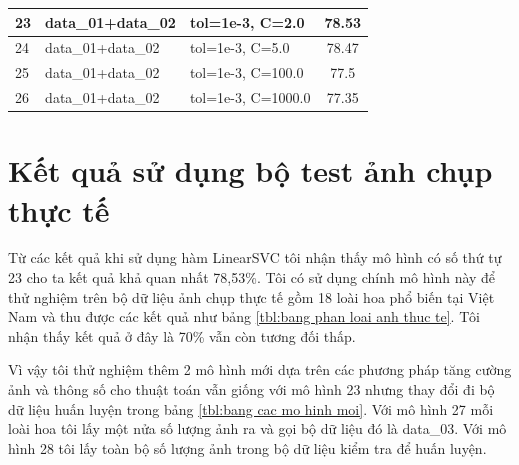 \documentclass[12pt]{report}
\begin{document}
\begin{table}
\begin{tabular}{|l|l|l|c|}
			23  & data\_01+data\_02                                               & tol=1e-3, C=2.0                                                             & 78.53                                                                 \\ \hline
			24  & data\_01+data\_02                                               & tol=1e-3, C=5.0                                                             & 78.47                                                                 \\ \hline
			25  & data\_01+data\_02                                               & tol=1e-3, C=100.0                                                           & 77.5                                                                  \\ \hline
			26  & data\_01+data\_02                                               & tol=1e-3, C=1000.0                                                          & 77.35                                                                 \\ \hline
			\end{tabular}
		\end{table}
		

		
		\section{Kết quả sử dụng bộ test ảnh chụp thực tế}
		Từ các kết quả khi sử dụng hàm LinearSVC tôi nhận thấy mô hình có số thứ tự  23 cho ta kết quả khả quan nhất 78,53\%. Tôi có sử dụng chính mô hình này để thử nghiệm trên bộ dữ liệu ảnh chụp thực tế gồm 18 loài hoa phổ biến tại Việt Nam và thu được các kết quả như bảng \ref{tbl:bang phan loai anh thuc te}. Tôi nhận thấy kết quả ở đây là 70\% vẫn còn tương đối thấp.
		
		Vì vậy tôi thử nghiệm thêm 2 mô hình mới dựa trên các phương pháp tăng cường ảnh và thông số cho thuật toán vẫn giống với mô hình 23 nhưng thay đổi đi bộ dữ liệu huấn luyện trong bảng \ref{tbl:bang cac mo hinh moi}.
		Với mô hình 27 mỗi loài hoa tôi lấy một nửa số lượng ảnh ra và gọi bộ dữ liệu đó là data\_03. Với mô hình 28 tôi lấy toàn bộ số lượng ảnh trong bộ dữ liệu kiểm tra để huấn luyện.
		
\end{document}
